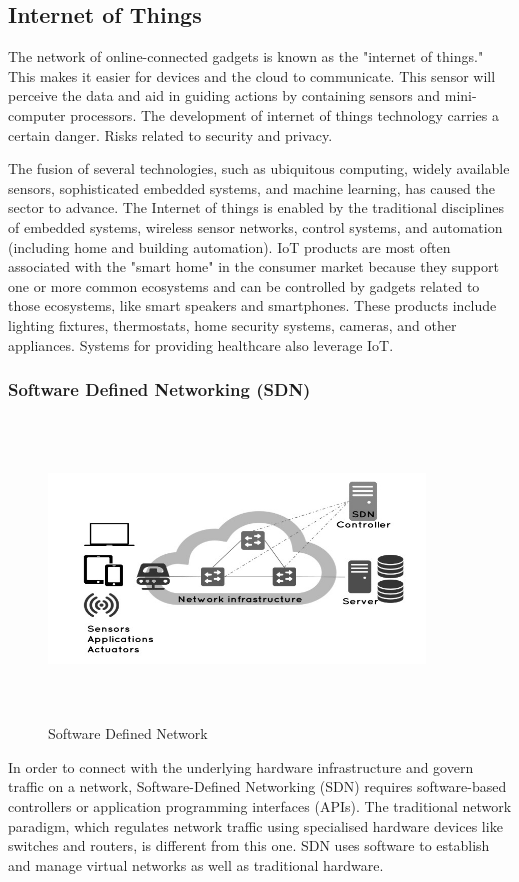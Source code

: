\documentclass[12pt,a4paper,twocolumn,fleqn]{article}
\begin{document}
\subsection{Internet of Things}

The network of online-connected gadgets is known as the "internet of things." This makes it easier for devices and the cloud to communicate. This sensor will perceive the data and aid in guiding actions by containing sensors and mini-computer processors. The development of internet of things technology carries a certain danger. Risks related to security and privacy. 

The fusion of several technologies, such as ubiquitous computing, widely available sensors, sophisticated embedded systems, and machine learning, has caused the sector to advance. The Internet of things is enabled by the traditional disciplines of embedded systems, wireless sensor networks, control systems, and automation (including home and building automation). IoT products are most often associated with the "smart home" in the consumer market because they support one or more common ecosystems and can be controlled by gadgets related to those ecosystems, like smart speakers and smartphones. These products include lighting fixtures, thermostats, home security systems, cameras, and other appliances. Systems for providing healthcare also leverage IoT.
 
\subsubsection{Software Defined Networking (SDN)}
\begin{figure} [H]
\includegraphics[width=10cm,height=8cm]{media/sdn.jpeg}
\centering
\caption{Software Defined Network}
\end{figure}
In order to connect with the underlying hardware infrastructure and govern traffic on a network, Software-Defined Networking (SDN) requires software-based controllers or application programming interfaces (APIs). The traditional network paradigm, which regulates network traffic using specialised hardware devices like switches and routers, is different from this one. SDN uses software to establish and manage virtual networks as well as traditional hardware.
\\
\end{document}
